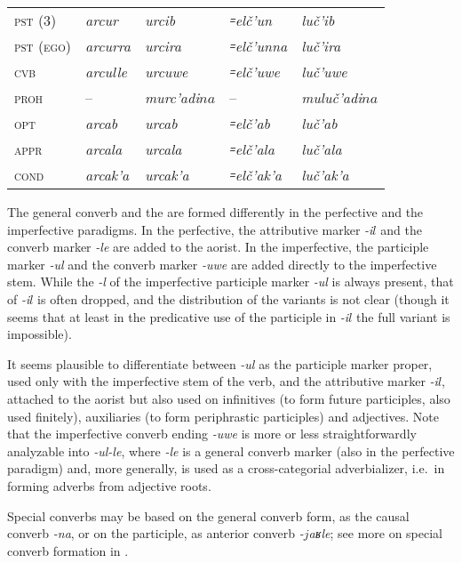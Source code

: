 \documentclass[output=paper]{langsci/langscibook}
\begin{document}
\begin{table}[t]
\begin{tabular}{@{}lllll@{}}
\textsc{pst} (3) & \emph{arcur} & \emph{urcib} & \emph{꞊elč'un} & \emph{luč'ib} \tabularnewline
\textsc{pst (ego)} & \emph{arcurra} & \emph{urcira} & \emph{꞊elč'unna} &  \emph{luč'ira}\tabularnewline
\textsc{cvb} & \emph{arculle} & \emph{urcuwe} & \emph{꞊elč'uwe} &
\emph{luč'uwe}\tabularnewline
\textsc{proh} & – & \emph{murc'adi\(na\)} & – &
\emph{muluč'adi\(na\)}\tabularnewline
\textsc{opt} & \emph{arcab} & \emph{urcab} & \emph{꞊elč'ab} &
\emph{luč'ab}\tabularnewline
\textsc{appr} & \emph{arcala} & \emph{urcala} & \emph{꞊elč'ala} &
\emph{luč'ala}\tabularnewline
\textsc{cond} & \emph{arcak'a} & \emph{urcak'a} & \emph{꞊elč'ak'a} &
\emph{luč'ak'a}\tabularnewline
\bottomrule
\end{tabular}

\vspace{-3\jot}
\end{table}

The {general converb} and the  are formed differently in the
perfective and the imperfective paradigms. In the perfective, the
attributive marker \emph{-i\(l\)} and the converb marker \emph{-le}
are added to the aorist. In the imperfective, the participle marker
\emph{-ul} and the converb marker \emph{-uwe} are added directly to the
imperfective stem. While the \emph{-l} of the imperfective participle
marker \emph{-ul} is always present, that of \emph{-i\(l\)} is
often dropped, and the distribution of the variants is not clear (though
it seems that at least in the predicative use of the participle in
\emph{-i\(l\)} the full variant is impossible).

It seems plausible to differentiate between \emph{-ul} as the participle
marker proper, used only with the imperfective stem of the verb, and the
attributive marker \mbox{\emph{-i\(l\)}}, attached to the aorist but also
used on infinitives (to form future participles, also used finitely),
auxiliaries (to form periphrastic participles) and adjectives. Note that the
imperfective converb ending \emph{-uwe} is more or less
straightforwardly analyzable into \emph{-ul-le}, where \emph{-le} is a
general converb marker (also in the perfective paradigm) and, more
generally, is used as a cross-categorial adverbializer, i.e.\ in forming
adverbs from adjective roots.

Special converbs may be based on the general converb form, as the causal
converb \emph{-na}, or on the participle, as anterior converb
\emph{-\(j\)aʁle}; see more on special converb formation in
\citet{sheyanova2019}.
\end{document}
